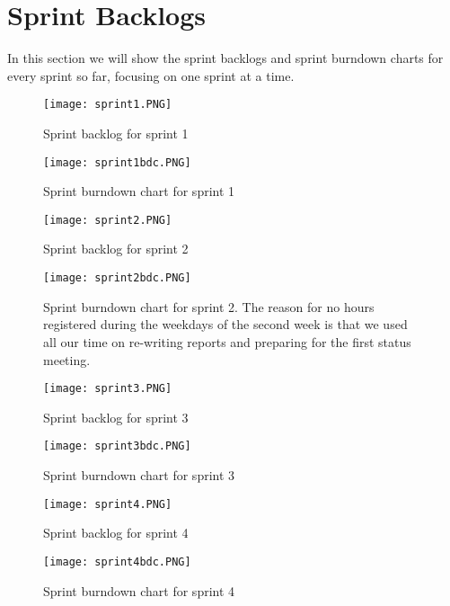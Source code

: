 \section{Sprint Backlogs}\label{sec:backlog}

In this section we will show the sprint backlogs and sprint burndown charts for every sprint so far, focusing on one sprint at a time.

\begin{figure}[H]
	\centering
	\graphicspath{ {./graphics/} }
    \centerline{\texttt{[image: sprint1.PNG]}}
    \caption{\label{fig:s1}Sprint backlog for sprint 1}
\end{figure}

\begin{figure}[H]
	\centering
	\graphicspath{ {./graphics/} }
    \centerline{\texttt{[image: sprint1bdc.PNG]}}
    \caption{\label{fig:s1bd}Sprint burndown chart for sprint 1}
\end{figure}

\begin{figure}[H]
	\centering
	\graphicspath{ {./graphics/} }
    \centerline{\texttt{[image: sprint2.PNG]}}
    \caption{\label{fig:s2}Sprint backlog for sprint 2}
\end{figure}

\begin{figure}[H]
	\centering
	\graphicspath{ {./graphics/} }
    \centerline{\texttt{[image: sprint2bdc.PNG]}}
    \caption{\label{fig:s2bd}Sprint burndown chart for sprint 2. The reason for no hours registered during the weekdays of the second week is that we used all our time on re-writing reports and preparing for the first status meeting.}
\end{figure}

\begin{figure}[H]
	\centering
	\graphicspath{ {./graphics/} }
    \centerline{\texttt{[image: sprint3.PNG]}}
    \caption{\label{fig:s3}Sprint backlog for sprint 3}
\end{figure}

\begin{figure}[H]
	\centering
	\graphicspath{ {./graphics/} }
    \centerline{\texttt{[image: sprint3bdc.PNG]}}
    \caption{\label{fig:s3bd}Sprint burndown chart for sprint 3}
\end{figure}

\begin{landscape}

\begin{figure}[H]
	\centering
	\graphicspath{ {./graphics/} }
    \centerline{\texttt{[image: sprint4.PNG]}}
    \caption{\label{fig:s4}Sprint backlog for sprint 4}
\end{figure}

\end{landscape}

\begin{figure}[H]
	\centering
	\graphicspath{ {./graphics/} }
    \centerline{\texttt{[image: sprint4bdc.PNG]}}
    \caption{\label{fig:s4bd}Sprint burndown chart for sprint 4}
\end{figure}